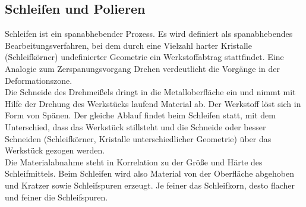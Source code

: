 \documentclass[12pt,a4paper,parskip,twoside,BCOR5mm,headsepline]{scrartcl}
\begin{document}
\subsection{Schleifen und Polieren}
Schleifen ist ein spanabhebender Prozess. Es wird definiert als spanabhebendes Bearbeitungsverfahren, bei dem durch eine Vielzahl harter Kristalle (Schleifkörner) undefinierter Geometrie ein Werkstoffabtrag stattfindet.\autocite[15]{hsp}  Eine Analogie zum Zerspanungsvorgang Drehen verdeutlicht die Vorgänge in der Deformationszone.\\
 Die Schneide des Drehmeißels dringt in die Metalloberfläche ein und nimmt mit Hilfe der Drehung des Werkstücks laufend Material ab. Der Werkstoff löst sich in Form von Spänen. Der gleiche Ablauf findet beim Schleifen statt, mit dem Unterschied, dass das Werkstück stillsteht und die Schneide oder besser Schneiden (Schleifkörner, Kristalle unterschiedlicher Geometrie) über das Werkstück gezogen werden.\\ Die Materialabnahme steht in Korrelation zu der Größe und Härte des Schleifmittels. Beim Schleifen wird also Material von der Oberfläche abgehoben und Kratzer sowie Schleifspuren erzeugt. Je feiner das Schleifkorn, desto flacher und feiner die Schleifspuren.\autocite[16-17]{hsp}\\  
\end{document}
